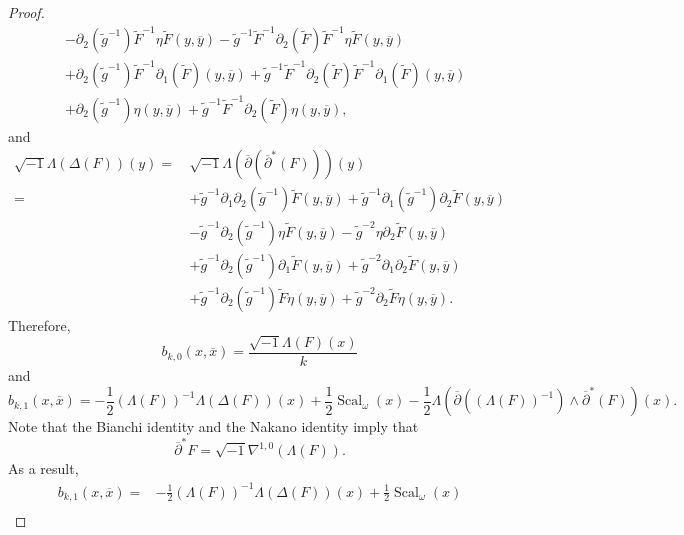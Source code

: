 \documentclass{amsart}
\theoremstyle{definition}
\theoremstyle{remark}
\numberwithin{equation}{section}
\DeclareMathOperator{\Scal}{Scal}
\begin{document}
\begin{proof}
\begin{align*}
    & - \partial_2(\tilde{g}^{-1}) \tilde{F}^{-1} \eta \tilde{F} (y,\overline{y}) - \tilde{g}^{-1} \tilde{F}^{-1} \partial_2(\tilde{F}) \tilde{F}^{-1} \eta \tilde{F} (y,\overline{y})\\
    & + \partial_2(\tilde{g}^{-1}) \tilde{F}^{-1} \partial_1(\tilde{F}) (y,\overline{y}) + \tilde{g}^{-1} \tilde{F}^{-1} \partial_2(\tilde{F}) \tilde{F}^{-1} \partial_1(\tilde{F}) (y,\overline{y}) \\
    & + \partial_2(\tilde{g}^{-1}) \eta (y,\overline{y}) + \tilde{g}^{-1} \tilde{F}^{-1} \partial_2(\tilde{F}) \eta (y,\overline{y}),
\end{align*}
and
\begin{align*}
\sqrt{-1} \Lambda (\Delta (F))(y) = \hspace{2pt} & \sqrt{-1}\Lambda (\overline{\partial}( \overline{\partial}^* (F))) (y) \\
    = \hspace{2pt} & + \tilde{g}^{-1}\partial_1\partial_2(\tilde{g}^{-1}) \tilde{F}(y,\overline{y}) + \tilde{g}^{-1} \partial_1(\tilde{g}^{-1}) \partial_2\tilde{F}(y,\overline{y}) \\
    & - \tilde{g}^{-1} \partial_2(\tilde{g}^{-1}) \eta \tilde{F} (y,\overline{y}) - \tilde{g}^{-2} \eta \partial_2 \tilde{F}(y,\overline{y}) \\
    & +\tilde{g}^{-1} \partial_2(\tilde{g}^{-1}) \partial_1\tilde{F}(y,\overline{y}) + \tilde{g}^{-2} \partial_1\partial_2\tilde{F}(y,\overline{y}) \\
    & + \tilde{g}^{-1} \partial_2(\tilde{g}^{-1}) \tilde{F} \eta(y,\overline{y}) + \tilde{g}^{-2} \partial_2\tilde{F}\eta(y,\overline{y}).
\end{align*}
Therefore,
$$
b_{k,0}(x,\overline{x}) = \frac{  \sqrt{-1}\Lambda (F)(x) }{k}
$$
and
$$
b_{k,1}(x,\overline{x}) = -\frac{1}{2}(\Lambda (F) )^{-1} \Lambda (\Delta (F)) (x) 
+ \frac{1}{2}\Scal_\omega(x) -  \frac{1}{2} \Lambda  \left ( \overline{\partial} \left ( (\Lambda (F))^{-1} \right ) \wedge \overline{\partial}^* (F)  \right ) (x).
$$
Note that the Bianchi identity and the Nakano identity imply that
\begin{equation*}
    \overline{\partial}^* F = \sqrt{-1} \nabla^{1,0}(\Lambda( F)).
\end{equation*}
As a result,
\begin{equation*}
\begin{split}
b_{k,1}(x,\overline{x})  = &  -\frac{1}{2}(\Lambda (F) )^{-1}\Lambda (\Delta (F)) (x) 
+ \frac{1}{2}\Scal_\omega(x)  \\

\end{split}
\end{equation*}
\end{proof}
\end{document}
